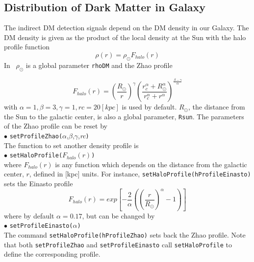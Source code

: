 \documentclass[12pt,a4paper]{article}
\begin{document}
\subsection{Distribution of Dark Matter  in Galaxy}
The indirect DM detection signals depend on the DM density in our Galaxy.
The DM density is given as the product of the local density at the Sun with the halo profile function 
\begin{equation}
\rho(r)=\rho_\odot F_{halo}(r)
\end{equation}
In \micro\ $\rho_\odot$ is a global parameter {\tt rhoDM} and  the Zhao profile~\cite{Zhao:1995cp}

\begin{equation}
\label{rho}
F_{halo}(r)=\left(\frac{ R_\odot}{r}\right)^{\gamma}
\left(\frac{r_c^{\alpha}+ R_\odot^{\alpha}}
{r_c^{\alpha}+r^{\alpha}}\right)^{\frac{\beta -\gamma}{\alpha}}
\end{equation}
with   $\alpha=1,\beta=3,\gamma=1, rc=20[kpc]$ is used by
default. $R_\odot$, the distance from the Sun to the galactic center,  is also a global parameter, {\tt Rsun}. The parameters of the Zhao profile  can be reset by\\ 
\noindent
$\bullet$ \verb|setProfileZhao(|$\alpha$,$\beta$,$\gamma$,{\it rc}\verb|)|\\
The function to set another  density profile is\\ 
\noindent
$\bullet$ \verb|setHaloProfile(|$F_{halo}(r)$\verb|)|\\
where $F_{halo}(r)$ is any function which depends on the distance from the galactic center,  $r$,
 defined   in [kpc] units.
For instance, \verb|setHaloProfile(hProfileEinasto)|  sets the Einasto profile\\
\begin{equation}
F_{halo}(r)=exp\left[-\frac{2}{\alpha}\left(\left(\frac{r}{R_\odot}\right)^{\alpha}-1\right)\right]
\end{equation}
where by default $\alpha=0.17$,   but can be changed by \\ 
\noindent
$\bullet$ \verb|setProfileEinasto(|$\alpha$\verb|)| \\
The command \verb|setHaloProfile(hProfileZhao)| sets back the Zhao profile. Note
that both {\tt setProfileZhao} and {\tt setProfileEinasto} call
{\tt setHaloProfile} to define the corresponding profile. 
\end{document}
